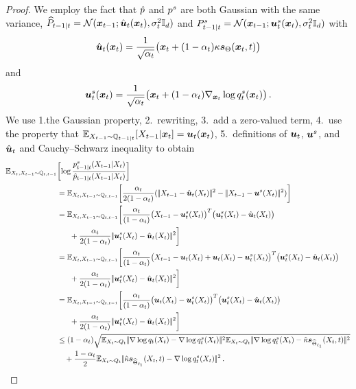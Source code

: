 \begin{proof}
We employ  the fact that   $\hat{p}$ and $p^s$ are both Gaussian with the same variance,   $\widehat{P}_{t-1|t}=\mathcal{N}(\textcolor{black}{\boldsymbol{x}}_{t-1};\hat{\boldsymbol{u}}_t(\textcolor{black}{\boldsymbol{x}}_t),\sigma_t^2\textcolor{black}{\mathbb{I}_{\textcolor{black}{d}}})$  and 
 $P^s_{t-1|t}=\mathcal{N}(\textcolor{black}{\boldsymbol{x}}_{t-1};\boldsymbol{u}^s_t(\textcolor{black}{\boldsymbol{x}}_t),\sigma_t^2\textcolor{black}{\mathbb{I}_{\textcolor{black}{d}}})$ with 
 \begin{equation*}
 \hat{\boldsymbol{u}}_t(\textcolor{black}{\boldsymbol{x}}_t)=\frac{1}{\sqrt{\alpha_t}}\bigl(\textcolor{black}{\boldsymbol{x}}_t+(1-\alpha_t)\kappa\textcolor{black}{\textcolor{black}{\boldsymbol{s}}_{\textcolor{black}{\Theta}}}(\textcolor{black}{\boldsymbol{x}}_t,t)\bigr)
\end{equation*}
and 
\begin{equation*}
    \boldsymbol{u}^s_t(\textcolor{black}{\boldsymbol{x}}_t)=\frac{1}{\sqrt{\alpha_t}}\bigl(\textcolor{black}{\boldsymbol{x}}_t+(1-\alpha_t)\nabla_{\textcolor{black}{\boldsymbol{x}}_t}\log q^s_t(\textcolor{black}{\boldsymbol{x}}_t)\bigr)\,.
\end{equation*}
We use 1.the Gaussian property, 2.~rewriting, 3.~add a zero-valued term, 4.~use the property that $\textcolor{black}{\mathbb{E}}_{X_{t-1}\sim \mathbb{Q}_{t-1|t}}[X_{t-1}|\textcolor{black}{\boldsymbol{x}}_t]=\boldsymbol{u}_t(\textcolor{black}{\boldsymbol{x}}_t)$, 5.~definitions of $\boldsymbol{u}_t$, $\boldsymbol{u}^s$, and $\hat{\boldsymbol{u}}_t$ and Cauchy–Schwarz inequality  to obtain 
    \begin{align*}
        \E_{X_t,X_{t-1}\sim \Fd_{t,t-1}}& \biggl[\log\frac{\Bdd^s_{t-1|t}(X_{t-1}|X_t)}{\BddA_{t-1|t}(X_{t-1}|X_t)}\biggr]\\
        &=\E_{X_t,X_{t-1}\sim \Fd_{t,t-1}} \biggl[\frac{\alpha_t}{2(1-\alpha_t)}(\norm{X_{t-1}-\uth(X_t)}^2-\norm{X_{t-1}-\us(X_t)}^2)\biggr]\\
        &=\E_{X_t,X_{t-1}\sim \Fd_{t,t-1}} \biggl[\frac{\alpha_t}{(1-\alpha_t)}\bigl(X_{t-1}-\us_t(X_t)\bigr)^{T}\bigl(\us_t(X_t)-\uth(X_t)\bigr)\\
        &~~~~~+\frac{\alpha_t}{2(1-\alpha_t)}\norm{\us_t(X_t)-\uth(X_t)}^2\biggr]\\
        &=\E_{X_t,X_{t-1}\sim \Fd_{t,t-1}} \biggl[\frac{\alpha_t}{(1-\alpha_t)}\bigl(X_{t-1}-\ut(X_t)+\ut(X_t)-\us_t(X_t)\bigr)^{T}\bigl(\us_t(X_t)-\uth(X_t)\bigr)\\
        &~~~~~+\frac{\alpha_t}{2(1-\alpha_t)}\norm{\us_t(X_t)-\uth(X_t)}^2\biggr]\\
        &=\E_{X_t,X_{t-1}\sim \Fd_{t,t-1}} \biggl[\frac{\alpha_t}{(1-\alpha_t)}\bigl(\ut(X_t)-\us_t(X_t)\bigr)^{T}\bigl(\us_t(X_t)-\uth(X_t)\bigr)\\
        &~~~~~+\frac{\alpha_t}{2(1-\alpha_t)}\norm{\us_t(X_t)-\uth(X_t)}^2\biggr]\\
    &\le (1-\alpha_t)\sqrt{\E_{X_t\sim Q_t}\norm{\nabla\log \Fdd_t(X_t)-\nabla\log \Fdds_t(X_t)}^2\E_{X_t\sim Q_t}\norm{\nabla\log \Fdds_t(X_t)-\scaleh\scorefh(X_t,t)}^2}\\
    &~~~+\frac{1-\alpha_t}{2}  \E_{X_t\sim Q_t}\norm{\scaleh\scorefh(X_t,t)-\nabla\log q^s_t(X_t)}^2\,.

\end{align*}
\end{proof}
